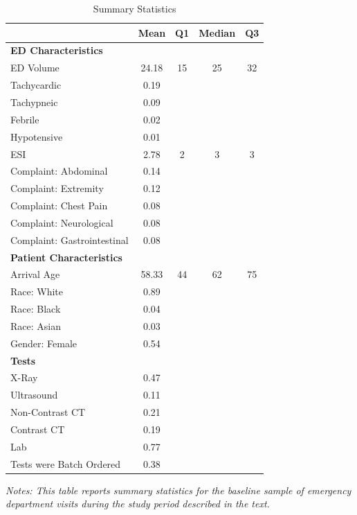 \documentclass[,,nonblindrev]{informs}
\begin{document}
\begin{table}[ht]
\centering
\caption{Summary Statistics}
\label{tab:summary_statistics}
\begin{tabular}{p{9cm}cccc}
\toprule
\textbf{} & \textbf{Mean} & \textbf{Q1} & \textbf{Median} & \textbf{Q3} \\
\midrule
\multicolumn{5}{l}{\textbf{ED Characteristics}} \\
ED Volume & 24.18 & 15 & 25 & 32 \\
Tachycardic & 0.19 & & & \\
Tachypneic & 0.09 & & & \\
Febrile & 0.02 & & & \\
Hypotensive & 0.01 & & & \\ 
ESI & 2.78 & 2 & 3 & 3 \\
Complaint: Abdominal & 0.14 & & & \\
Complaint: Extremity & 0.12 & & & \\
Complaint: Chest Pain & 0.08 & & & \\
Complaint: Neurological & 0.08 & & & \\
Complaint: Gastrointestinal & 0.08 & & & \\
\midrule
\multicolumn{5}{l}{\textbf{Patient Characteristics}} \\
Arrival Age & 58.33 & 44 & 62 & 75 \\
Race: White & 0.89 & & & \\
Race: Black & 0.04 & & & \\
Race: Asian & 0.03 & & & \\
Gender: Female & 0.54 & & & \\
\midrule
\multicolumn{5}{l}{\textbf{Tests}} \\
X-Ray & 0.47 & & & \\
Ultrasound & 0.11 & & & \\
Non-Contrast CT & 0.21 & & & \\
Contrast CT & 0.19 & & & \\
Lab & 0.77 & & & \\
Tests were Batch Ordered & 0.38 & & & \\
\bottomrule
\end{tabular}
\begin{tablenotes}
\small
\item \textit{Notes: This table reports summary statistics for the baseline sample of emergency department visits during the study period described in the text.}
\end{tablenotes}
\end{table}
\end{document}
